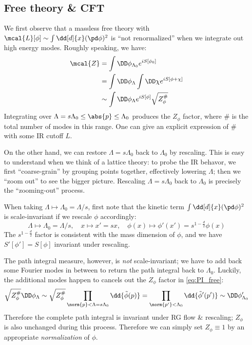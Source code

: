 \documentclass[a4paper
	,10pt
]{article}
\begin{document}
\subsection{Free theory \& CFT}
	We first observe that a massless free theory with $
		\mcal{L}[\phi]
		\sim \int \dd[d]{x} (\pd\phi)^2
	$ is ``not renormalized'' when we integrate out high energy modes. Roughly speaking, we have:
	\begin{equation}
	\begin{aligned}
	  \mcal{Z}
	  &= \int \DD\phi_{\Lambda_0}
	      e^{iS[\phi_0]} \\
	  &= \int \DD\phi_{\Lambda}
	    \int \DD\chi
	      e^{iS[\phi + \chi]} \\
	  &\sim \int \DD\phi_{\Lambda}
	      e^{iS[\phi]}
	      \sqrt{Z_\phi^\#}
	\end{aligned}
	\label{eq:PI_free}
	\end{equation}
	Integrating over $\Lambda = s\Lambda_0 \le \abs{p} \le \Lambda_0$ produces the $Z_\phi$ factor, where $\#$ is the total number of modes in this range. One can give an explicit expression of $\#$ with some IR cutoff $L$.
	
	On the other hand, we can restore $\Lambda = s\Lambda_0$ back to $\Lambda_0$ by rescaling. This is easy to understand when we think of a lattice theory: to probe the IR behavor, we first ``coarse-grain'' by grouping points together, effectively lowering $\Lambda$; then we ``zoom out'' to see the bigger picture. Rescaling $\Lambda = s\Lambda_0$ back to $\Lambda_0$ is precisely the ``zooming-out'' process. 
	
	When taking $\Lambda\mapsto \Lambda_0 = \Lambda / s$, first note that the kinetic term $\int \dd[d]{x} (\pd\phi)^2$ is scale-invariant if we rescale $\phi$ accordingly:
	\begin{equation}
		\Lambda\mapsto \Lambda_0 = \Lambda / s,
	\quad
		x\mapsto x' = sx,
	\quad
		\phi(x) \mapsto
		\phi'(x') = s^{1 - \frac{d}{2}} \phi(x)
	\end{equation}
	The $s^{1 - \frac{d}{2}}$ factor is consistent with the mass dimension of $\phi$, and we have $S'[\phi'] = S[\phi]$ invariant under rescaling. 
	
	The path integral measure, however, is \textit{not} scale-invariant; we have to add back some Fourier modes in between to return the path integral back to $\Lambda_0$. Luckily, the additional modes happen to cancels out the $Z_\phi$ factor in \eqref{eq:PI_free}:
	\begin{equation}
		\sqrt{Z_\phi^\#} \DD\phi_{\Lambda}
		\sim \sqrt{Z_\phi^\#}
			\prod_{\norm{p} < \Lambda = s\Lambda_0}
			\dd{\tilde{\phi}(p)}
		= \prod_{\norm{p'} < \Lambda_0}
			\dd{\tilde{\phi}'(p')}
		\sim \DD\phi'_{\Lambda_0}
	\end{equation}
	Therefore the complete path integral is invariant under RG flow \& rescaling; $Z_\phi$ is also unchanged during this process. Therefore we can simply set $Z_\phi \equiv 1$ by an appropriate \textit{normalization} of $\phi$.
	
\end{document}
